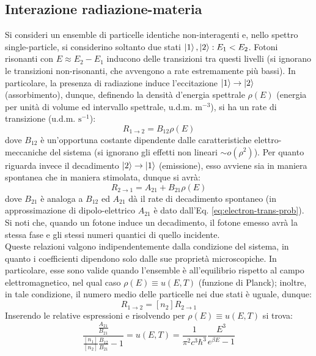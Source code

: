 \subsection{Interazione radiazione-materia}

Si consideri un ensemble di particelle identiche non-interagenti e, nello spettro single-particle, si considerino soltanto due stati $ \ket{1} , \ket{2} : E_1 < E_2 $. Fotoni risonanti con $ E \approx E_2 - E_1 $ inducono delle transizioni tra questi livelli (si ignorano le transizioni non-risonanti, che avvengono a rate estremamente più bassi). In particolare, la presenza di radiazione induce l'eccitazione $ \ket{1} \rightarrow \ket{2} $ (assorbimento), dunque, definendo la densità d'energia spettrale $ \rho(E) $ (energia per unità di volume ed intervallo spettrale, u.d.m. $ \text{m}^{-3} $), si ha un rate di transizione (u.d.m. $ \text{s}^{-1} $):
\begin{equation}
	R_{1 \rightarrow 2} = B_{12} \rho(E)
\end{equation}
dove $ B_{12} $ è un'opportuna costante dipendente dalle caratteristiche elettro-meccaniche del sistema (si ignorano gli effetti non lineari $ \sim o(\rho^2) $). Per quanto riguarda invece il decadimento $ \ket{2} \rightarrow \ket{1} $ (emissione), esso avviene sia in maniera spontanea che in maniera stimolata, dunque si avrà:
\begin{equation}
	R_{2 \rightarrow 1} = A_{21} + B_{21} \rho(E)
\end{equation}
dove $ B_{21} $ è analoga a $ B_{12} $ ed $ A_{21} $ dà il rate di decadimento spontaneo (in approssimazione di dipolo-elettrico $ A_{21} $ è dato dall'Eq. \ref{eq:electron-trans-prob}). Si noti che, quando un fotone induce un decadimento, il fotone emesso avrà la stessa fase e gli stessi numeri quantici di quello incidente. \\
Queste relazioni valgono indipendentemente dalla condizione del sistema, in quanto i coefficienti dipendono solo dalle sue proprietà microscopiche. In particolare, esse sono valide quando l'ensemble è all'equilibrio rispetto al campo elettromagnetico, nel qual caso $ \rho(E) \equiv u(E,T) $ (funzione di Planck); inoltre, in tale condizione, il numero medio delle particelle nei due stati è uguale, dunque:
\begin{equation}
	[n_1] R_{1 \rightarrow 2} = [n_2] R_{2 \rightarrow 1}
\end{equation}
Inserendo le relative espressioni e risolvendo per $ \rho(E) \equiv u(E,T) $ si trova:
\begin{equation*}
	\frac{\frac{A_{21}}{B_{21}}}{\frac{[n_1]}{[n_2]} \frac{B_{12}}{B_{21}} - 1} = u(E,T) = \frac{1}{\pi^2 c^3 \hbar^3} \frac{E^3}{e^{\beta E} - 1}
\end{equation*}
